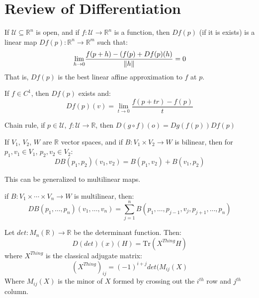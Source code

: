\documentclass[crop=false,class=article]{standalone}                           %
\begin{document}
    \section{Review of Differentiation}
        If $\mathcal{U}\subseteq\mathbb{R}^{n}$ is open, and if
        $f:\mathcal{U}\rightarrow\mathbb{R}^{n}$ is a function, then
        $Df(p)$ (if it is exists) is a linear map
        $Df(p):\mathbb{R}^{n}\rightarrow\mathbb{R}^{m}$ such that:
        \begin{equation}
            \underset{h\rightarrow{0}}{\lim}
                \frac{f(p+h)-(f(p)+Df(p)(h)}{\lVert h\rVert}=0
        \end{equation}
        That is, $Df(p)$ is the best linear affine approximation to $f$ at
        $p$.
        \begin{theorem}
            If $f\in{C}^{1}$, then $Df(p)$ exists and:
            \begin{equation}
                Df(p)(v)=\underset{t\rightarrow{0}}{\lim}
                \frac{f(p+tr)-f(p)}{t}
            \end{equation}
        \end{theorem}
        Chain rule, if $p\in\mathcal{U}$,
        $f:\mathcal{U}\rightarrow\mathbb{R}$,
        then $D(g\circ{f})(o)=Dg(f(p))Df(p)$
        \begin{theorem}
            If $V_{1}$, $V_{2}$, $W$ are $\mathbb{R}$ vector spaces, and
            if $B:V_{1}\times{V}_{2}\rightarrow{W}$ is bilinear, then
            for $p_{1},v_{1}\in{V}_{1}$, $p_{2},v_{2}\in{V}_{2}$:
            \begin{equation}
                DB(p_{1},p_{2})(v_{1},v_{2})=B(p_{1},v_{2})+B(v_{1},p_{2})
            \end{equation}
        \end{theorem}
        This can be generalized to multilinear maps.
        \begin{theorem}
            if $B:V_{1}\times\cdots\times{V}_{n}\rightarrow{W}$ is
            multilinear, then:
            \begin{equation}
                DB(p_{1},\dots,p_{n})(v_{1},\dots,v_{n})=
                \sum_{j=1}^{n}B(p_{1},\dots,p_{j-1},v_{j},p_{j+1},\dots,p_{n})
            \end{equation}
        \end{theorem}
        \begin{example}
            Let $det:M_{n}(\mathbb{R})\rightarrow\mathbb{R}$ be the
            determinant function. Then:
            \begin{equation}
                D(det)(x)(H)=\textrm{Tr}(X^{Thing}H)
            \end{equation}
            where $X^{Thing}$ is the classical adjugate matrix:
            \begin{equation}
                (X^{Thing})_{ij}=(\minus{1})^{i+j}det(M_{ij}(X)
            \end{equation}
            Where $M_{ij}(X)$ is the minor of $X$ formed by crossing out the
            $i^{th}$ row and $j^{th}$ column.
        \end{example}
\end{document}

